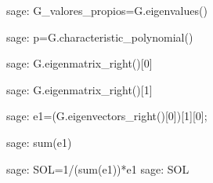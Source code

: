 \begin{sagecommandline}
    sage: G_valores_propios=G.eigenvalues()
\end{sagecommandline}

\begin{sagecommandline}
    sage: p=G.characteristic_polynomial()
\end{sagecommandline}

\begin{sagecommandline}
    sage: G.eigenmatrix_right()[0]
\end{sagecommandline}

\begin{sagecommandline}
    sage: G.eigenmatrix_right()[1]
\end{sagecommandline}
    
\begin{sagecommandline}
    sage: e1=(G.eigenvectors_right()[0])[1][0];
\end{sagecommandline}
    
\begin{sagecommandline}
    sage: sum(e1)
\end{sagecommandline}
    
\begin{sagecommandline}
    sage: SOL=1/(sum(e1))*e1
    sage: SOL
\end{sagecommandline}